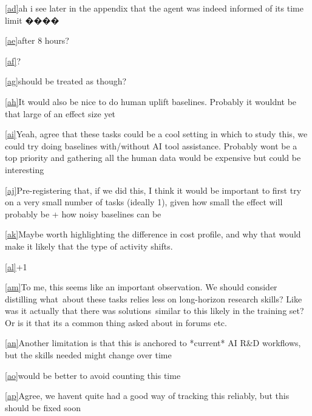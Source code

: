 \documentclass[
]{article}
\begin{document}
\label{cmnt30}\hyperref[cmnt_ref30]{{[}ad{]}}{ah i see
later in the appendix that the agent was indeed informed of its time
limit ����}

\label{cmnt31}\hyperref[cmnt_ref31]{{[}ae{]}}{after 8
hours?}

\label{cmnt32}\hyperref[cmnt_ref32]{{[}af{]}}{?}

\label{cmnt33}\hyperref[cmnt_ref33]{{[}ag{]}}{should be
treated as though?}

\label{cmnt34}\hyperref[cmnt_ref34]{{[}ah{]}}{It would
also be nice to do human uplift baselines. Probably it
wouldn\textquotesingle t be that large of an effect size yet}

\label{cmnt35}\hyperref[cmnt_ref35]{{[}ai{]}}{Yeah, agree
that these tasks could be a cool setting in which to study this, we
could try doing baselines with/without AI tool assistance. Probably
won\textquotesingle t be a top priority and gathering all the human data
would be expensive but could be interesting}

\label{cmnt36}\hyperref[cmnt_ref36]{{[}aj{]}}{Pre-registering
that, if we did this, I think it would be important to first try on a
very small number of tasks (ideally 1), given how small the effect will
probably be + how noisy baselines can be}

\label{cmnt37}\hyperref[cmnt_ref37]{{[}ak{]}}{Maybe worth
highlighting the difference in cost profile, and why that would make it
likely that the type of activity shifts.}

\label{cmnt38}\hyperref[cmnt_ref38]{{[}al{]}}{+1}

\label{cmnt39}\hyperref[cmnt_ref39]{{[}am{]}}{To me, this
seems like an important observation. We should consider distilling
what~about these tasks relies less on long-horizon research skills? Like
was it actually that there was solutions~similar to this likely in the
training set? Or is it that it\textquotesingle s a common thing asked
about in forums etc.}

\label{cmnt40}\hyperref[cmnt_ref40]{{[}an{]}}{Another
limitation is that this is anchored to *current* AI R\&D workflows, but
the skills needed might change over time}

\label{cmnt41}\hyperref[cmnt_ref41]{{[}ao{]}}{would be
better to avoid counting this time}

\label{cmnt42}\hyperref[cmnt_ref42]{{[}ap{]}}{Agree, we
haven\textquotesingle t quite had a good way of tracking this reliably,
but this should be fixed soon}
\end{document}
